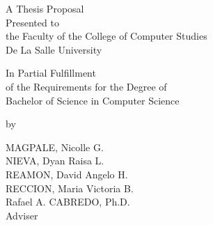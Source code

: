 %
%
%                 
\newcommand{\mydate}{\formatdate{18}{07}{2018}}
\begin{titlepage}
\centering



\vspace{1.75cm}
A Thesis Proposal\\
Presented to\\
the Faculty of the College of Computer Studies\\
De La Salle University

\vspace{1.75cm}
In Partial Fulfillment\\
of the Requirements for the Degree of\\
Bachelor of  Science in Computer Science

\vspace{1.75cm}
by\\
\vspace{1cm}

MAGPALE, Nicolle G.\\
NIEVA, Dyan Raisa L. \\
REAMON, David Angelo H.  \\
RECCION, Maria Victoria B.  \\

\vspace{1.75cm}
Rafael A. CABREDO, Ph.D. \\
Adviser

\vspace{1.75cm}

\mydate
\end{titlepage}
